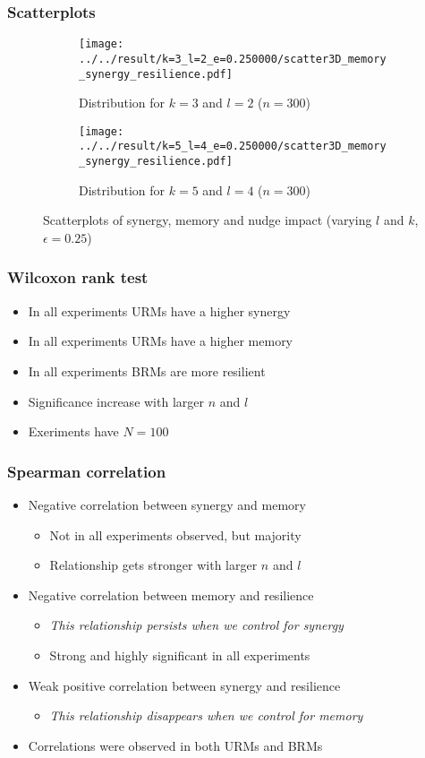 \documentclass[hyperref={pdfpagelabels=false}]{beamer}
\begin{document}
\begin{frame}
\frametitle{Scatterplots}
\begin{figure}[ht]
    \centering
    \begin{subfigure}[b]{0.48\textwidth}
        \texttt{[image: ../../result/k=3\_l=2\_e=0.250000/scatter3D\_memory\_synergy\_resilience.pdf]}
        \caption{Distribution for $k=3$ and $l=2$ ($n=300$)}
    \end{subfigure}
    \begin{subfigure}[b]{0.48\textwidth}
        \texttt{[image: ../../result/k=5\_l=4\_e=0.250000/scatter3D\_memory\_synergy\_resilience.pdf]}
        \caption{Distribution for $k=5$ and $l=4$ ($n=300$)}
    \end{subfigure}
    \caption{Scatterplots of synergy, memory and nudge impact (varying $l$ and $k$, $\epsilon = 0.25$)}
    \label{fig:3dscatter}
\end{figure}
\end{frame}

\begin{frame}
\frametitle{Wilcoxon rank test}
\begin{itemize}
\item In all experiments URMs have a higher synergy
\item In all experiments URMs have a higher memory
\item In all experiments BRMs are more resilient
\item Significance increase with larger $n$ and $l$
\item Exeriments have $N = 100$
\end{itemize}
\end{frame}

\begin{frame}
\frametitle{Spearman correlation}
\begin{itemize}
\item Negative correlation between synergy and memory
\begin{itemize}
\item Not in all experiments observed, but majority
\item Relationship gets stronger with larger $n$ and $l$
\end{itemize}
\item Negative correlation between memory and resilience
\begin{itemize}
\item \textit{This relationship persists when we control for synergy}
\item Strong and highly significant in all experiments
\end{itemize}
\item Weak positive correlation between synergy and resilience
\begin{itemize}
\item \textit{This relationship disappears when we control for memory}
\end{itemize}
\item Correlations were observed in both URMs and BRMs
\end{itemize}
\end{frame}
\end{document}
